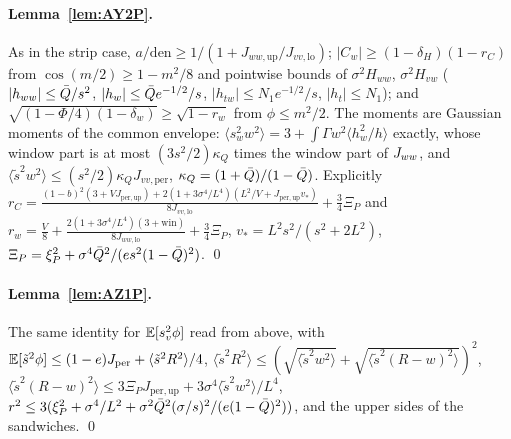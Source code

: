 \paragraph*{Lemma~\ref{lem:AY2P}.}
As in the strip case, $a/\mathrm{den}\ge1/(1+J_{ww,\mathrm{up}}/J_{vv,\mathrm{lo}})$; $|C_w|\ge(1-\delta_H)(1-r_C)$ from $\cos(m/2)\ge1-m^2/8$ and pointwise
bounds of $\sigma^2H_{ww}$, $\sigma^2H_{vw}$ ($|h_{ww}|\le\bar Q/s^2$, $|h_w|\le\bar Q e^{-1/2}/s$, $|h_{tw}|\le N_1e^{-1/2}/s$, $|h_t|\le N_1$); and
$\sqrt{(1-\Phi/4)(1-\delta_w)}\ge\sqrt{1-r_w}$ from $\phi\le m^2/2$. The moments are Gaussian moments of the common envelope:
$\langle s_w^2w^2\rangle=3+\int\Gamma w^2\langle h_w^2/h\rangle$ exactly, whose window part is at most $(3s^2/2)\kappa_Q$ times the window part of $J_{ww}$,
and $\langle\tilde s^2w^2\rangle\le(s^2/2)\kappa_QJ_{vv,\mathrm{per}}$, $\kappa_Q=(1+\bar Q)/(1-\bar Q)$. Explicitly
$r_C=\tfrac{(1-b)^2(3+VJ_{\mathrm{per,up}})+2(1+3\sigma^4/L^4)(L^2/V+J_{\mathrm{per,up}}v_*)}{8J_{vv,\mathrm{lo}}}+\tfrac34\Xi_P$ and
$r_w=\tfrac V8+\tfrac{2(1+3\sigma^4/L^4)(3+\mathrm{win})}{8J_{ww,\mathrm{lo}}}+\tfrac34\Xi_P$, $v_*=L^2s^2/(s^2+2L^2)$,
$\Xi_P=\xi_P^2+\sigma^4\bar Q^2/(es^2(1-\bar Q)^2)$. \qed

\paragraph*{Lemma~\ref{lem:AZ1P}.}
The same identity for $\mathbb{E}[s_v^2\phi]$ read from above, with $\mathbb{E}[\tilde s^2\phi]\le(1-e)J_{\mathrm{per}}+\langle\tilde s^2R^2\rangle/4$,
$\langle\tilde s^2R^2\rangle\le(\sqrt{\langle\tilde s^2w^2\rangle}+\sqrt{\langle\tilde s^2(R-w)^2\rangle})^2$, $\langle\tilde s^2(R-w)^2\rangle\le3\Xi_PJ_{\mathrm{per,up}}+
3\sigma^4\langle\tilde s^2w^2\rangle/L^4$, $r^2\le3(\xi_P^2+\sigma^4/L^2+\sigma^2\bar Q^2(\sigma/s)^2/(e(1-\bar Q)^2))$, and the upper sides of the sandwiches. \qed
